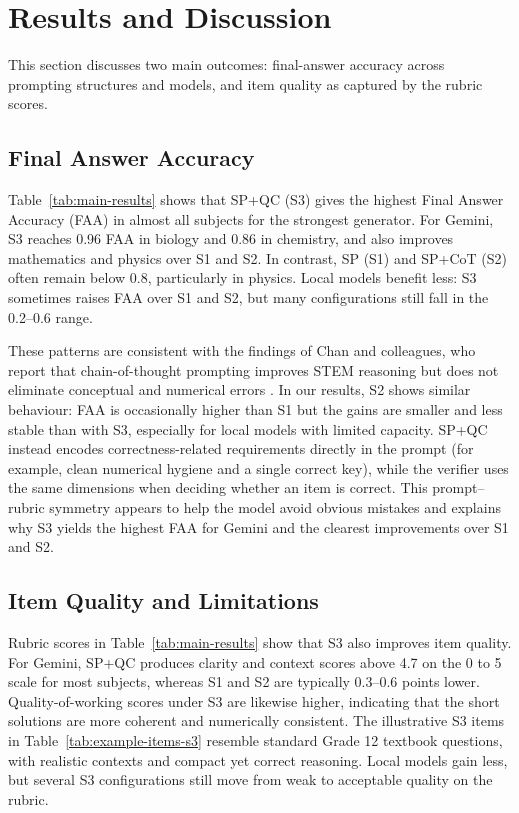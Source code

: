 \documentclass[a4paper,conference]{IEEEtran}
\begin{document}
\section{Results and Discussion}

This section discusses two main outcomes: final-answer accuracy across prompting structures and models, and item quality as captured by the rubric scores.

\subsection{Final Answer Accuracy}

Table~\ref{tab:main-results} shows that SP+QC (S3) gives the highest Final Answer Accuracy (FAA) in almost all subjects for the strongest generator. For Gemini, S3 reaches 0.96 FAA in biology and 0.86 in chemistry, and also improves mathematics and physics over S1 and S2. In contrast, SP (S1) and SP+CoT (S2) often remain below 0.8, particularly in physics. Local models benefit less: S3 sometimes raises FAA over S1 and S2, but many configurations still fall in the 0.2–0.6 range.

These patterns are consistent with the findings of Chan and colleagues, who report that chain-of-thought prompting improves STEM reasoning but does not eliminate conceptual and numerical errors \cite{chan2025}. In our results, S2 shows similar behaviour: FAA is occasionally higher than S1 but the gains are smaller and less stable than with S3, especially for local models with limited capacity. SP+QC instead encodes correctness-related requirements directly in the prompt (for example, clean numerical hygiene and a single correct key), while the verifier uses the same dimensions when deciding whether an item is correct. This prompt–rubric symmetry appears to help the model avoid obvious mistakes and explains why S3 yields the highest FAA for Gemini and the clearest improvements over S1 and S2.

\subsection{Item Quality and Limitations}

Rubric scores in Table~\ref{tab:main-results} show that S3 also improves item quality. For Gemini, SP+QC produces clarity and context scores above 4.7 on the 0 to 5 scale for most subjects, whereas S1 and S2 are typically 0.3–0.6 points lower. Quality-of-working scores under S3 are likewise higher, indicating that the short solutions are more coherent and numerically consistent. The illustrative S3 items in Table~\ref{tab:example-items-s3} resemble standard Grade 12 textbook questions, with realistic contexts and compact yet correct reasoning. Local models gain less, but several S3 configurations still move from weak to acceptable quality on the rubric.
\end{document}
